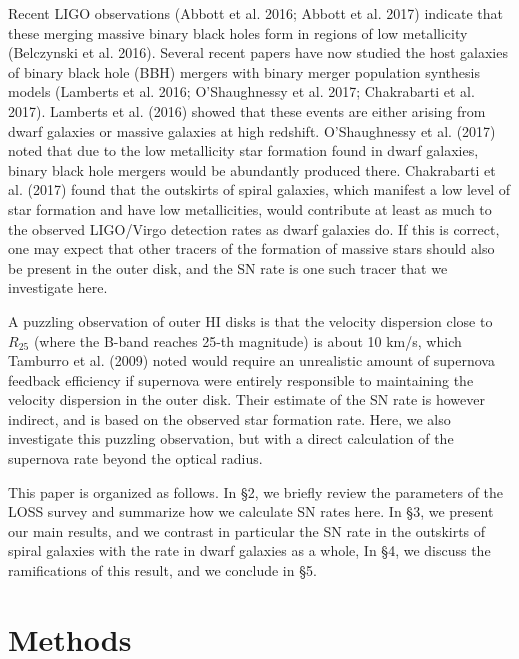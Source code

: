 \documentclass[apj]{emulateapj}
\begin{document}
Recent LIGO observations (Abbott et al. 2016; Abbott et al. 2017) indicate that these merging massive binary black holes form in regions of low metallicity (Belczynski et al. 2016).  Several recent papers have now studied the host galaxies of binary black hole (BBH) mergers with binary merger population synthesis models (Lamberts et al. 2016; O'Shaughnessy et al. 2017; Chakrabarti et al. 2017).  Lamberts et al. (2016) showed that these events are either arising from dwarf galaxies or massive galaxies at high redshift.  O'Shaughnessy et al. (2017) noted that due to the low metallicity star formation found in dwarf galaxies, binary black hole mergers would be abundantly produced there.  Chakrabarti et al. (2017) found that the outskirts of spiral galaxies, which manifest a low level of star formation and have low metallicities, would contribute at least as much to the observed LIGO/Virgo detection rates as dwarf galaxies do.  If this is correct, one may expect that other tracers of the formation of massive stars should also be present in the outer disk, and the SN rate is one such tracer that we investigate here.

A puzzling observation of outer HI disks is that the velocity dispersion close to $R_{25}$ (where the B-band reaches 25-th magnitude) is about 10 km/s, which Tamburro et al. (2009) noted would require an unrealistic amount of supernova feedback efficiency if supernova were entirely responsible to maintaining the velocity dispersion in the outer disk.  Their estimate of the SN rate is however indirect, and is based on the observed star formation rate.  Here, we also investigate this puzzling observation, but with a direct calculation of the supernova rate beyond the optical radius.  

This paper is organized as follows.   In \S 2, we briefly review the parameters of the LOSS survey and summarize how we calculate SN rates here.  In \S 3, we present our main results, and we contrast in particular the SN rate in the outskirts of spiral galaxies with the rate in dwarf galaxies as a whole,  In \S 4, we discuss the ramifications of this result, and we conclude in \S 5.

\section{Methods}
\end{document}
